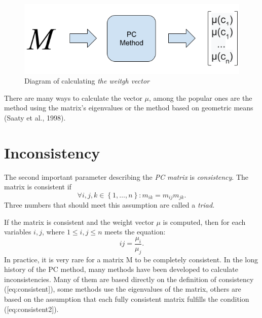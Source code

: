 \begin{figure}[ht]
\centerline{\includegraphics[scale=2.5]{fig1.png}}
\caption{Diagram of calculating \textit{the weitgh vector}}
\label{fig:fig1}
\end{figure}

There are many ways to calculate the vector $\mu$, among the popular ones are the method using the matrix's eigenvalues or the method based on geometric means (Saaty et al., 1998).

\section{Inconsistency}
\label{subsec:inconsistency}
The second important parameter describing the \textit{PC matrix} is \textit{consistency}. The matrix is consistent if 
	\begin{equation} 
		\forall i,j,k \in\left\{ 1,\ldots,n\right\} :m_{ik}=m_{ij}m_{jk}.
	\end{equation}
Three numbers that should meet this assumption are called a \textit{triad}.

If the matrix is consistent and the weight vector $\mu$ is computed, then for each variables $i,j$, where $1\leq i,j\leq n$ meets the equation: 
	\begin{equation} 
		{ij}=\frac{\mu_{i}}{\mu_{j}}.
 	\end{equation}
In practice, it is very rare for a matrix M to be completely consistent. In the long history of the PC method, many methods have been developed to calculate inconsistencies. Many of them are based directly on the definition of consistency ([eq:consistent]), some methods use the eigenvalues of the matrix, others are based on the assumption that each fully consistent matrix fulfills the condition ([eq:consistent2]).